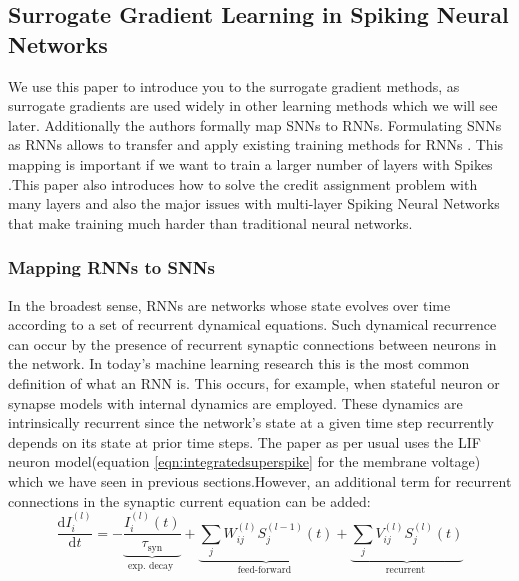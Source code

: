 \documentclass[12pt]{report}
\begin{document}
\subsection{Surrogate Gradient Learning in Spiking Neural Networks}
We use this paper to introduce you to the surrogate gradient methods, as surrogate gradients are used widely in other learning methods which we will see later. Additionally the authors formally map SNNs to RNNs. Formulating SNNs as RNNs allows to transfer and apply existing training methods for RNNs \cite{neftci2019}. This mapping is important if we want to train a larger number of layers with Spikes .This paper also introduces how to solve the credit assignment problem with many layers and also the major issues with multi-layer Spiking Neural Networks that make training much harder than traditional neural networks.
\subsubsection{Mapping RNNs to SNNs}
In the broadest sense, RNNs are networks whose state evolves over time according to a set of recurrent dynamical equations. Such dynamical recurrence can occur by the presence of recurrent synaptic connections between neurons in the network. In today's machine learning research this is the most common definition of what an RNN is. This occurs, for example, when stateful neuron or synapse models with internal dynamics are employed. These dynamics are intrinsically recurrent since the network's state at a given time step recurrently depends on its state at prior time steps. The paper as per usual uses the LIF neuron model(equation \ref{eqn:integratedsuperspike} for the membrane voltage) which we have seen in previous sections.However, an additional term for recurrent connections in the synaptic current equation can be added:
\begin{equation}
\label{eqn:surrogate_current_dynamics}
\frac{\mathrm{d} I_{i}^{(l)}}{\mathrm{d} t}=-\underbrace{\frac{I_{i}^{(l)}(t)}{\tau_{\mathrm{syn}}}}_{\text {exp. decay }}+\underbrace{\sum_{j} W_{i j}^{(l)} S_{j}^{(l-1)}(t)}_{\text {feed-forward }}+\underbrace{\sum_{j} V_{i j}^{(l)} S_{j}^{(l)}(t)}_{\text {recurrent }}
\end{equation}
\end{document}

